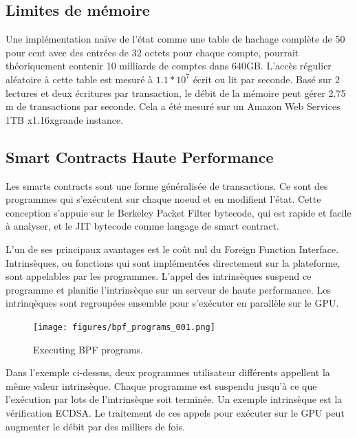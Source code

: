 \documentclass[12pt]{article}
\begin{document}
\subsection{Limites de mémoire}
Une implémentation naïve de l'état comme une table de hachage complète de 50 pour cent avec des entrées de 32 octets pour chaque compte, pourrait théoriquement contenir 10 milliards de comptes dans 640GB. L'accès régulier aléatoire à cette table est mesuré à \(1.1 * 10^7\) écrit ou lit par seconde. Basé sur 2 lectures et deux écritures par transaction, le débit de la mémoire peut gérer 2.75 m de transactions par seconde. Cela a été mesuré sur un Amazon Web Services 1TB x1.16xgrande instance.

\subsection{Smart Contracts Haute Performance}\label{sec:smartcontracts}

Les smarts contracts sont une forme généralisée de transactions. Ce sont des programmes qui s'exécutent sur chaque noeud et en modifient l'état. Cette conception s'appuie sur le Berkeley Packet Filter bytecode, qui est rapide et facile à analyser, et le JIT bytecode comme langage de smart contract.

L'un de ses principaux avantages est le coût nul du Foreign Function Interface. Intrinsèques, ou  fonctions qui sont implémentées directement sur la plateforme, sont appelables par  les programmes. L'appel des intrinsèques suspend ce programme et planifie l'intrinsèque sur un serveur de haute performance. Les intrinqèques sont regroupées ensemble pour s'exécuter en parallèle sur le GPU.

\begin{figure}
  \begin{center}
    \centering
    \texttt{[image: figures/bpf\_programs\_001.png]}
    \caption[Fig 11]{Executing  BPF programs.\label{fig_11}}
  \end{center}
  \end{figure}

Dans l'exemple ci-dessus, deux programmes utilisateur différents appellent la même valeur intrinsèque. Chaque programme est suspendu jusqu'à ce que l'exécution par lots de l'intrinsèque soit terminée. Un exemple intrinsèque est la vérification ECDSA. Le traitement de ces appels pour exécuter sur le GPU peut augmenter le débit par des milliers de fois.
\end{document}
